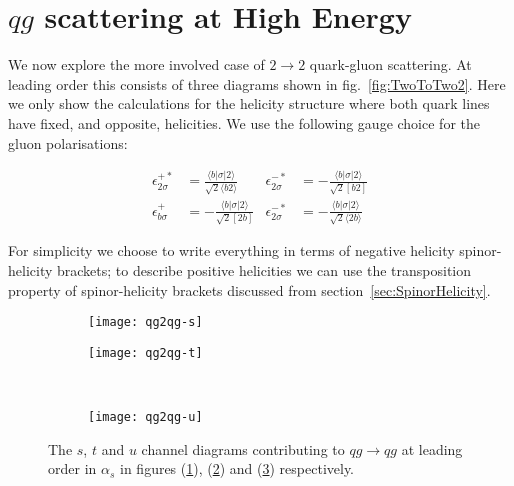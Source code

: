 	\section{$qg$ scattering at High Energy}

		We now explore the more involved case of $2\rightarrow 2$ quark-gluon scattering.  At leading order this
		consists of three diagrams shown in fig.~\eqref{fig:TwoToTwo2}.  Here we only show the calculations
		for the helicity structure where both quark lines have fixed, and opposite, helicities.  We use
		the following gauge choice for the gluon polarisations:

		\begin{align}
		\epsilon^{+*}_{2\sigma}&=\frac{\langle b|\sigma|2\rangle}{\sqrt{2}\langle b2\rangle} & \epsilon^{-*}_{2\sigma} &= -\frac{\langle b|\sigma|2\rangle}{\sqrt{2}[b2]} \\
		\epsilon^{+}_{b\sigma}&=-\frac{\langle b|\sigma|2\rangle}{\sqrt{2}[2b]} & \epsilon^{-*}_{2\sigma} &= -\frac{\langle b|\sigma|2\rangle}{\sqrt{2}\langle 2b\rangle}
		\end{align}

		For simplicity we choose to write everything in terms of negative helicity spinor-helicity brackets;
		to describe positive helicities we can use the transposition property of spinor-helicity brackets discussed
		from section~\ref{sec:SpinorHelicity}.

		\begin{figure}[h]
			\centering
			\begin{subfigure}[b]{0.3\textwidth}
				\texttt{[image: qg2qg-s]}
				\caption{}
				\label{fig:qg2qg-s}
			\end{subfigure}

			\begin{subfigure}[b]{0.3\textwidth}
				\texttt{[image: qg2qg-t]}
				\caption{}
				\label{fig:qg2qg-t}
			\end{subfigure}
			~
			\begin{subfigure}[b]{0.3\textwidth}
				\texttt{[image: qg2qg-u]}
				\caption{}
				\label{fig:qg2qg-u}
			\end{subfigure}
			\caption{The $s$, $t$ and $u$ channel diagrams contributing to $qg\rightarrow qg$ at leading
			         order in $\alpha_s$ in figures (\ref{fig:qg2qg-s}), (\ref{fig:qg2qg-t}) and (\ref{fig:qg2qg-u})
			         respectively.}
			\label{fig:TwoToTwo2}
		\end{figure}

